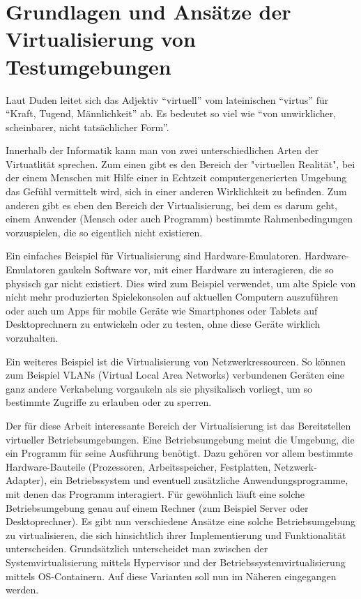 \section{Grundlagen und Ansätze der Virtualisierung von Testumgebungen}

Laut Duden leitet sich das Adjektiv "`virtuell"' vom lateinischen "`virtus"' für "`Kraft, Tugend, Männlichkeit"' ab. Es bedeutet so viel wie "`von unwirklicher, scheinbarer, nicht tatsächlicher Form"'.

Innerhalb der Informatik kann man von zwei unterschiedlichen Arten der Virtuatlität sprechen. Zum einen gibt es den Bereich der "virtuellen Realität", bei der einem Menschen mit Hilfe einer in Echtzeit computergenerierten Umgebung das Gefühl vermittelt wird, sich in einer anderen Wirklichkeit zu befinden. Zum anderen gibt es eben den Bereich der Virtualisierung, bei dem es darum geht, einem Anwender (Mensch oder auch Programm) bestimmte Rahmenbedingungen vorzuspielen, die so eigentlich nicht existieren.

Ein einfaches Beispiel für Virtualisierung sind Hardware-Emulatoren. Hardware-Emulatoren gaukeln Software vor, mit einer Hardware zu interagieren, die so physisch gar nicht existiert. Dies wird zum Beispiel verwendet, um alte Spiele von nicht mehr produzierten Spielekonsolen auf aktuellen Computern auszuführen oder auch um Apps für mobile Geräte wie Smartphones oder Tablets auf Desktoprechnern zu entwickeln oder zu testen, ohne diese Geräte wirklich vorzuhalten.

Ein weiteres Beispiel ist die Virtualisierung von Netzwerkressourcen. So können zum Beispiel VLANs (Virtual Local Area Networks) verbundenen Geräten eine ganz andere Verkabelung vorgaukeln als sie physikalisch vorliegt, um so bestimmte Zugriffe zu erlauben oder zu sperren.

Der für diese Arbeit interessante Bereich der Virtualisierung ist das Bereitstellen virtueller Betriebsumgebungen. Eine Betriebsumgebung meint die Umgebung, die ein Programm für seine Ausführung benötigt. Dazu gehören vor allem bestimmte Hardware-Bauteile (Prozessoren, Arbeitsspeicher, Festplatten, Netzwerk-Adapter), ein Betriebssystem und eventuell zusätzliche Anwendungsprogramme, mit denen das Programm interagiert. Für gewöhnlich läuft eine solche Betriebsumgebung genau auf einem Rechner (zum Beispiel Server oder Desktoprechner). Es gibt nun verschiedene Ansätze eine solche Betriebsumgebung zu virtualisieren, die sich hinsichtlich ihrer Implementierung und Funktionalität unterscheiden. Grundsätzlich unterscheidet man zwischen der Systemvirtualisierung mittels Hypervisor und der Betriebssystemvirtualisierung mittels OS-Containern. Auf diese Varianten soll nun im Näheren eingegangen werden.


